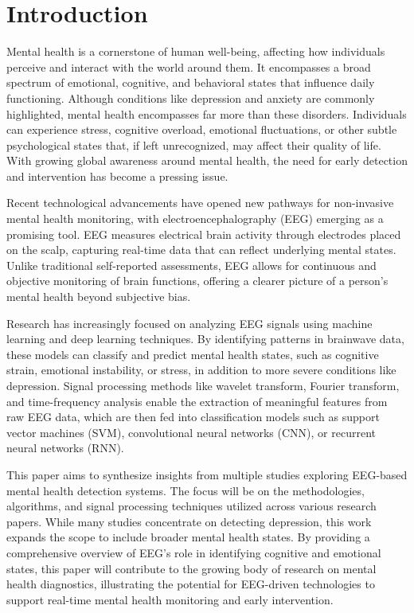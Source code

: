 \documentclass[conference]{IEEEtran}
\begin{document}
\section{Introduction}
Mental health is a cornerstone of human well-being, affecting how individuals perceive and interact with the world around them. It encompasses a broad spectrum of emotional, cognitive, and behavioral states that influence daily functioning. Although conditions like depression and anxiety are commonly highlighted, mental health encompasses far more than these disorders. Individuals can experience stress, cognitive overload, emotional fluctuations, or other subtle psychological states that, if left unrecognized, may affect their quality of life. With growing global awareness around mental health, the need for early detection and intervention has become a pressing issue.

Recent technological advancements have opened new pathways for non-invasive mental health monitoring, with electroencephalography (EEG) emerging as a promising tool. EEG measures electrical brain activity through electrodes placed on the scalp, capturing real-time data that can reflect underlying mental states. Unlike traditional self-reported assessments, EEG allows for continuous and objective monitoring of brain functions, offering a clearer picture of a person’s mental health beyond subjective bias.

Research has increasingly focused on analyzing EEG signals using machine learning and deep learning techniques. By identifying patterns in brainwave data, these models can classify and predict mental health states, such as cognitive strain, emotional instability, or stress, in addition to more severe conditions like depression. Signal processing methods like wavelet transform, Fourier transform, and time-frequency analysis enable the extraction of meaningful features from raw EEG data, which are then fed into classification models such as support vector machines (SVM), convolutional neural networks (CNN), or recurrent neural networks (RNN).

This paper aims to synthesize insights from multiple studies exploring EEG-based mental health detection systems. The focus will be on the methodologies, algorithms, and signal processing techniques utilized across various research papers. While many studies concentrate on detecting depression, this work expands the scope to include broader mental health states. By providing a comprehensive overview of EEG’s role in identifying cognitive and emotional states, this paper will contribute to the growing body of research on mental health diagnostics, illustrating the potential for EEG-driven technologies to support real-time mental health monitoring and early intervention.
\end{document}

